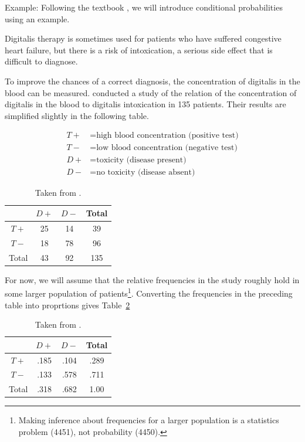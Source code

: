 \begin{frame}[allowframebreaks]{Example: }
  Following the textbook \citep{rice07}, we will introduce conditional probabilities using an example.
  
  \alert{Digitalis therapy} \citep{rahimtoola04} is sometimes used for patients who have suffered congestive heart failure, but there is a risk of intoxication, a serious side effect that is difficult to diagnose.
  
  
  To improve the chances of a correct diagnosis, the concentration of digitalis in the blood can be measured. \citet{beller71} conducted a study of the relation of the concentration of digitalis in the blood to digitalis intoxication in 135 patients.
  Their results are simplified slightly in the following table.
  
  \begin{align*}
    T+ &= \text{high blood concentration (positive test)}\\
    T- &= \text{low blood concentration (negative test)}\\
    D+ &= \text{toxicity (disease present)}\\
    D- &= \text{no toxicity (disease absent)}
  \end{align*}
  
  \begin{table}
    \centering
    \begin{tabular}{c|cc|c}
            & $D+$ & $D-$ & Total \\\hline
      $T+$  & 25   & 14   & 39 \\
      $T-$  & 18   & 78   & 96 \\\hline
      Total & 43   & 92   & 135 \\
    \end{tabular}
    \caption{\label{tab:digitalis}Taken from \citep[][Chapter~1]{rice07}.}
  \end{table}
  
  For now, we will assume that the relative frequencies in the study roughly hold in some larger population of patients\footnote{Making inference about frequencies for a larger population is a \alert{statistics} problem (4451), not probability (4450).}. Converting the frequencies in the preceding table into proprtions gives Table~\ref{tab:digitalisProps}
  
    \begin{table}
    \centering
    \begin{tabular}{c|cc|c}
            & $D+$  & $D-$ & Total \\\hline
      $T+$  & .185  & .104 & .289 \\
      $T-$  & .133  & .578 & .711 \\\hline
      Total & .318  & .682 & 1.00 \\
    \end{tabular}
    \caption{\label{tab:digitalisProps}Taken from \citep[][Chapter~1]{rice07}.}
  \end{table}
  

\end{frame}
